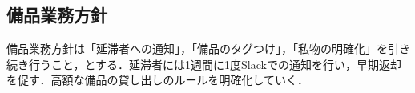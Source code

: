 \subsection*{備品業務方針}
備品業務方針は「延滞者への通知」，「備品のタグつけ」，「私物の明確化」を引き続き行うこと，とする．延滞者には1週間に1度Slackでの通知を行い，早期返却を促す．高額な備品の貸し出しのルールを明確化していく．
